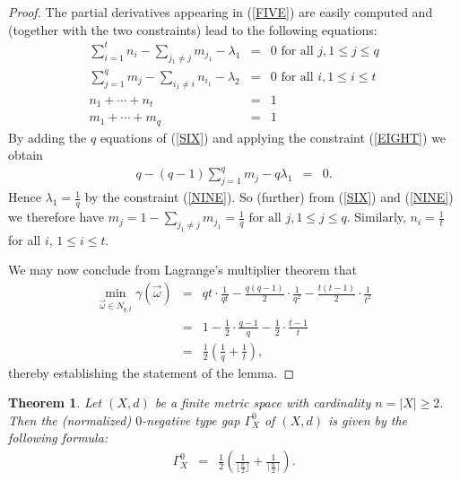 \documentclass[10pt]{amsart}
\newtheorem{thm}{Theorem}[section]
\theoremstyle{definition}
\theoremstyle{remark}
\begin{document}
\begin{proof}
The partial derivatives appearing in (\ref{FIVE}) are easily computed and
(together with the two constraints) lead to the following equations:
\begin{eqnarray}
\sum\limits_{i=1}^{t} n_{i} - \sum\limits_{j_{1} \not= j} m_{j_{1}} - \lambda_{1} 
& = & 0 \text{ for all } j, 1 \leq j \leq q \label{SIX} \\
\sum\limits_{j=1}^{q} m_{j} - \sum\limits_{i_{1} \not= i} n_{i_{1}} - \lambda_{2}
& = & 0 \text{ for all } i, 1 \leq i \leq t \label{SEVEN} \\
n_{1} + \cdots + n_{t} & = & 1 \label{EIGHT} \\
m_{1} + \cdots + m_{q} & = & 1 \label{NINE}
\end{eqnarray}
By adding the $q$ equations of (\ref{SIX}) and applying the constraint (\ref{EIGHT}) we obtain
\begin{eqnarray*}
q - (q-1) \sum\limits_{j=1}^{q} m_{j} - q \lambda_{1} & = & 0.
\end{eqnarray*}
Hence $\lambda_{1} = \frac{1}{q}$ by the constraint (\ref{NINE}). So (further) from (\ref{SIX}) and (\ref{NINE})
we therefore have $m_{j} = 1 - \sum\limits_{j_{1} \not= j} m_{j_{1}} = \frac{1}{q} \text{ for all } j, 1 \leq j \leq q$.
Similarly, $n_{i} = \frac{1}{t}$ for all $i$, $1 \leq i \leq t$.

We may now conclude from Lagrange's multiplier theorem that
\begin{eqnarray*}
\min\limits_{\vec{\omega} \in N_{q,t}} \gamma(\vec{\omega})
& = & qt \cdot \frac{1}{qt} - \frac{q(q-1)}{2} \cdot \frac{1}{q^{2}}
- \frac{t(t-1)}{2} \cdot \frac{1}{t^{2}} \\
& = & 1 - \frac{1}{2} \cdot \frac{q-1}{q} - \frac{1}{2} \cdot \frac{t-1}{t} \\
& = & \frac{1}{2} \left( \frac{1}{q} + \frac{1}{t} \right), 
\end{eqnarray*}
thereby establishing the statement of the lemma.

\end{proof}

\begin{thm}\label{zerogap}
Let $(X,d)$ be a finite metric space with cardinality $n = |X| \geq 2$. Then the (normalized)
$0$-negative type gap $\Gamma_{X}^{0}$ of $(X,d)$ is given by the following formula:
\begin{eqnarray*}
\Gamma_{X}^{0} & = &
\frac{1}{2} \left( \frac{1}{\lfloor \frac{n}{2} \rfloor} + \frac{1}{\lceil \frac{n}{2} \rceil} \right).
\end{eqnarray*}
\end{thm}
\end{document}
